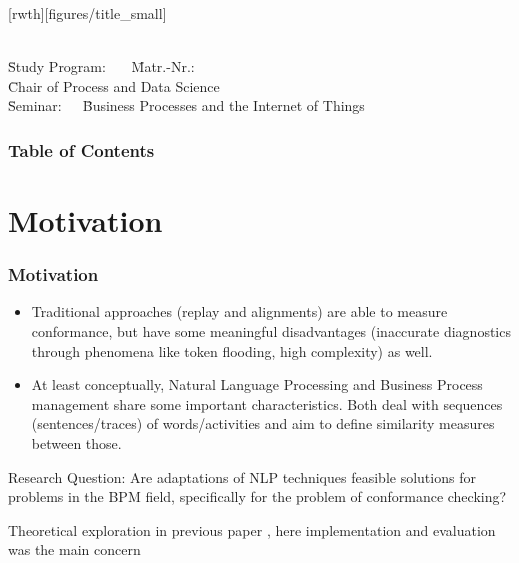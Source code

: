 \documentclass{beamer}
\author[\firstname]{\firstname~\lastname~\email}
\institute[RWTH]{RWTH Aachen University}
\begin{document}
	\beamertemplatenavigationsymbolsempty
[rwth][figures/title_small]{}
\begin{frame}[plain]
	\vspace{1cm}
	\titlepage
	
	\vspace{-6em}
	\parbox{0cm}{
		\begin{tabbing}
			\=\textbf{\firstname~\lastname}\=\\[0.4em]
			\=Study Program: \studyProgram~~~\=Matr.-Nr.:\matrNo\\[0.4em]
			\=Chair of Process and Data Science \=\\%
			\={Seminar:}~~~\=Business Processes and the Internet of Things\\
		\end{tabbing}
	}
\end{frame}
	\begin{frame}
		\frametitle{Table of Contents}
		\tableofcontents
	\end{frame}
	\section{Motivation}
	\begin{frame}
		\frametitle{Motivation}
		\begin{itemize}
			\item Traditional approaches (replay and alignments) are able to measure conformance, but have some meaningful disadvantages (inaccurate diagnostics through phenomena like token flooding, high complexity) as well.
			\item At least conceptually, Natural Language Processing and Business Process management share some important characteristics. Both deal with sequences (sentences/traces) of words/activities and aim to define similarity measures between those.
		\end{itemize}
		\begin{block}{Research Question:}
			Are adaptations of NLP techniques feasible solutions for problems in the BPM field, specifically for the problem of conformance checking?
		\end{block}
		\alert{Theoretical exploration in previous paper \cite{KBWe18}, here \cite{PBWe20} implementation and evaluation was the main concern}
	\end{frame}
\end{document}
